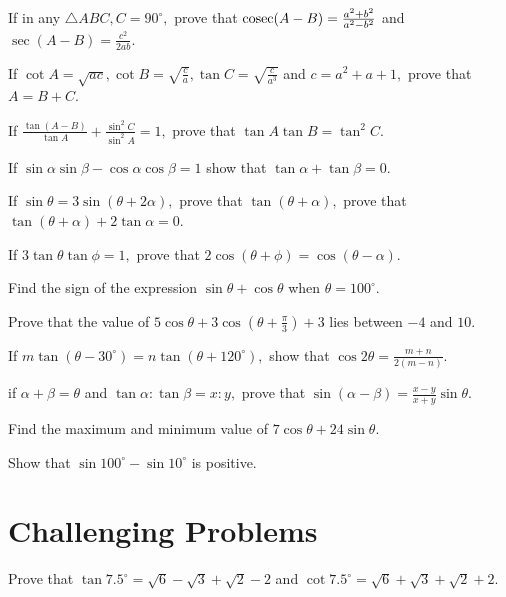 \item If in any $\triangle ABC, C = 90^\circ,$ prove that ${\rm cosec}(A - B) = \frac{a^2 + b^2}{a^2 - b^2}$ and $\sec(A
    - B) = \frac{c^2}{2ab}$.

\item If $\cot A = \sqrt{ac}, \cot B = \sqrt{\frac{c}{a}}, \tan C = \sqrt{\frac{c}{a^3}}$ and $c = a^2 + a + 1,$ prove
    that $A = B + C$.

\item If $\frac{\tan(A - B)}{\tan A} + \frac{\sin^2C}{\sin^2A} = 1,$ prove that $\tan A\tan B = \tan^2 C$.

\item If $\sin\alpha\sin\beta - \cos\alpha\cos\beta = 1$ show that $\tan\alpha + \tan\beta = 0$.

\item If $\sin\theta = 3\sin(\theta + 2\alpha),$ prove that $\tan(\theta + \alpha),$ prove that $\tan(\theta +
    \alpha) + 2\tan\alpha = 0$.

\item If $3\tan\theta\tan\phi = 1,$ prove that $2\cos(\theta + \phi) = \cos(\theta - \alpha)$.

\item Find the sign of the expression $\sin\theta + \cos\theta$ when $\theta = 100^\circ$.

\item Prove that the value of $5\cos\theta + 3\cos\left(\theta + \frac{\pi}{3}\right) + 3$ lies between $-4$ and
    $10$.

\item If $m\tan(\theta - 30^\circ) = n\tan(\theta + 120^\circ),$ show that $\cos2\theta = \frac{m + n}{2(m - n)}$.

\item if $\alpha + \beta = \theta$ and $\tan\alpha:\tan\beta = x:y,$ prove that $\sin(\alpha - \beta) = \frac{x -
    y}{x + y}\sin\theta$.

\item Find the maximum and minimum value of $7\cos\theta + 24\sin\theta$.

\item Show that $\sin 100^\circ - \sin 10^\circ$ is positive.
\stopitemize

\section{Challenging Problems}
\startitemize[n, 1*broad]
\item Prove that $\tan 7.5^\circ = \sqrt{6} - \sqrt{3} + \sqrt{2} - 2$ and $\cot 7.5^\circ = \sqrt{6}
    + \sqrt{3} + \sqrt{2} + 2$.

